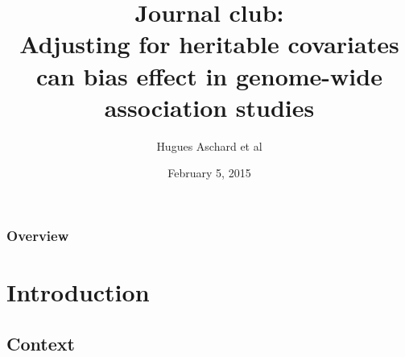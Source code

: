 \documentclass{beamer}
\title[Journal Club]{Journal club:\\Adjusting for heritable covariates can bias effect in genome-wide association studies } %
\author{Hugues Aschard et al} %
\institute[] %
{
The American Journal of Human Genetics\\ %
\medskip
}
\date{February 5, 2015} %
\begin{document}
\begin{frame}
\titlepage %
\end{frame}

\begin{frame}
\frametitle{Overview} %
\tableofcontents %
\end{frame}


\section{Introduction} %

\subsection{Context} %
\end{document}
